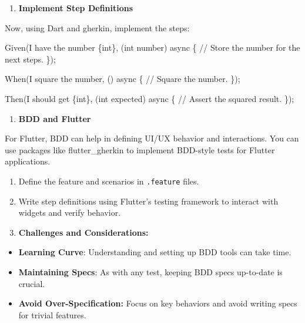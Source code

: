 \documentclass[
]{article}
\newenvironment{Shaded}{\begin{snugshade}}{\end{snugshade}}
\newcommand{\AttributeTok}[1]{\textcolor[rgb]{0.16,0.50,0.73}{#1}}
\newcommand{\CommentTok}[1]{\textcolor[rgb]{0.48,0.49,0.49}{#1}}
\newcommand{\DataTypeTok}[1]{\textcolor[rgb]{0.16,0.50,0.73}{#1}}
\newcommand{\NormalTok}[1]{\textcolor[rgb]{0.81,0.81,0.76}{#1}}
\newcommand{\OperatorTok}[1]{\textcolor[rgb]{0.81,0.81,0.76}{#1}}
\newcommand{\StringTok}[1]{\textcolor[rgb]{0.96,0.31,0.31}{#1}}
\providecommand{\tightlist}{%
  \setlength{\itemsep}{0pt}\setlength{\parskip}{0pt}}
\begin{document}
\begin{enumerate}
\def\labelenumi{\arabic{enumi}.}
\setcounter{enumi}{2}
\tightlist
\item
  \textbf{Implement Step Definitions}
\end{enumerate}

Now, using Dart and gherkin, implement the steps:

\begin{Shaded}
\begin{Highlighting}[]
\NormalTok{Given(}\StringTok{\textquotesingle{}I have the number \{int\}\textquotesingle{}}\OperatorTok{,}\NormalTok{ (}\DataTypeTok{int}\NormalTok{ number) }\AttributeTok{async} \OperatorTok{\{}
  \CommentTok{// Store the number for the next steps.}
\OperatorTok{\}}\NormalTok{);}

\NormalTok{When(}\StringTok{\textquotesingle{}I square the number\textquotesingle{}}\OperatorTok{,}\NormalTok{ () }\AttributeTok{async} \OperatorTok{\{}
  \CommentTok{// Square the number.}
\OperatorTok{\}}\NormalTok{);}

\NormalTok{Then(}\StringTok{\textquotesingle{}I should get \{int\}\textquotesingle{}}\OperatorTok{,}\NormalTok{ (}\DataTypeTok{int}\NormalTok{ expected) }\AttributeTok{async} \OperatorTok{\{}
  \CommentTok{// Assert the squared result.}
\OperatorTok{\}}\NormalTok{);}
\end{Highlighting}
\end{Shaded}

\begin{enumerate}
\def\labelenumi{\arabic{enumi}.}
\setcounter{enumi}{3}
\tightlist
\item
  \textbf{BDD and Flutter}
\end{enumerate}

For Flutter, BDD can help in defining UI/UX behavior and interactions.
You can use packages like flutter\_gherkin to implement BDD-style tests
for Flutter applications.

\begin{enumerate}
\def\labelenumi{\arabic{enumi}.}
\item
  Define the feature and scenarios in \texttt{.feature} files.
\item
  Write step definitions using Flutter's testing framework to interact
  with widgets and verify behavior.
\item
  \textbf{Challenges and Considerations:}
\end{enumerate}

\begin{itemize}
\tightlist
\item
  \textbf{Learning Curve}: Understanding and setting up BDD tools can
  take time.
\item
  \textbf{Maintaining Specs}: As with any test, keeping BDD specs
  up-to-date is crucial.
\item
  \textbf{Avoid Over-Specification:} Focus on key behaviors and avoid
  writing specs for trivial features.
\end{itemize}
\end{document}
